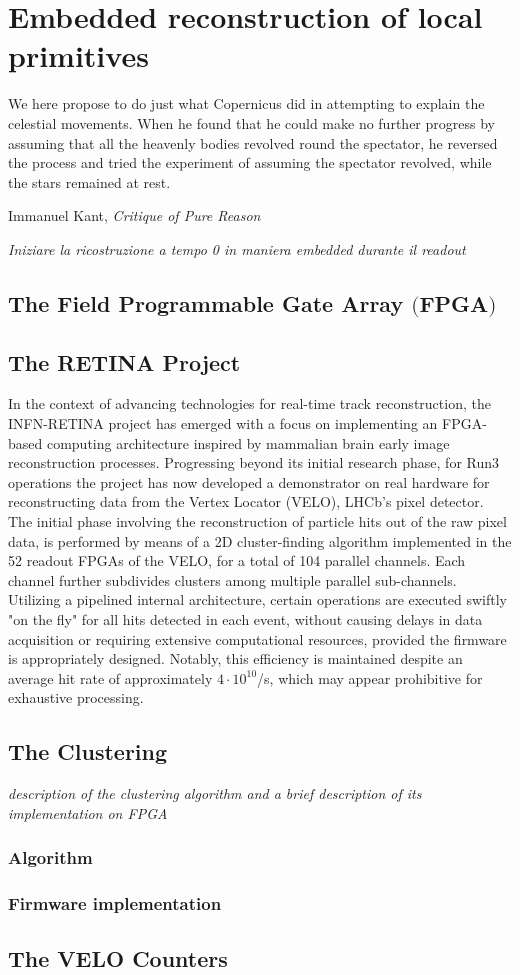 
\chapter{Embedded reconstruction of local primitives}
\label{chp:retina}
\epigraph{We here propose to do just what Copernicus did in attempting to explain the celestial movements. When he found that he could make no further progress by assuming that all the heavenly bodies revolved round the spectator, he reversed the process and tried the experiment of assuming the spectator revolved, while the stars remained at rest.}{Immanuel Kant, \textit{Critique of Pure Reason}}
\textit{Iniziare la ricostruzione a tempo 0 in maniera embedded durante il readout}

\section[The Field Programmable Gate Array]{The Field Programmable Gate Array $\bigl($FPGA$\bigr)$}

\section{The RETINA Project}
In the context of advancing technologies for real-time track reconstruction, the INFN-RETINA project has emerged with a focus on implementing an FPGA-based computing architecture inspired by  mammalian brain early image reconstruction processes. Progressing beyond its initial research phase, for Run3 operations the project has now developed a demonstrator on real hardware for reconstructing data from the Vertex Locator (VELO), LHCb's pixel detector. The initial phase involving the reconstruction of particle hits out of the raw pixel data, is performed by means of a 2D cluster-finding algorithm implemented in the 52 readout FPGAs of the VELO, for a total of 104 parallel channels. Each channel further subdivides clusters among multiple parallel sub-channels. Utilizing a pipelined internal architecture, certain operations are executed swiftly "on the fly" for all hits detected in each event, without causing delays in data acquisition or requiring extensive computational resources, provided the firmware is appropriately designed. Notably, this efficiency is maintained despite an average hit rate of approximately $4 \cdot 10^{10}$/s, which may appear prohibitive for exhaustive processing.\\

\section{The Clustering}
\textit{description of the clustering algorithm and a brief description of its implementation on FPGA\\
}
\subsection{Algorithm}
\subsection{Firmware implementation}

\section{The VELO Counters}



